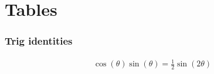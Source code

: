 \part{Tables}
\section{Trig identities}
\begin{align}
    \cos(\theta)\sin(\theta) = \frac{1}{2}\sin(2\theta)
\end{align}